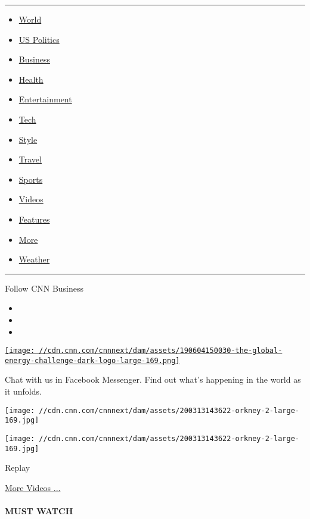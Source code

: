 \begin{center}\rule{0.5\linewidth}{\linethickness}\end{center}

\begin{itemize}
\tightlist
\item
  \href{/world}{World}
\item
  \href{/politics}{US Politics}
\item
  \href{/business}{Business}
\item
  \href{/health}{Health}
\item
  \href{/entertainment}{Entertainment}
\item
  \href{/business/tech}{Tech}
\item
  \href{/style}{Style}
\item
  \href{/travel}{Travel}
\item
  \href{/sport}{Sports}
\item
  \href{/videos}{Videos}
\item
  \href{/specials}{Features}
\item
  \href{/more}{More}
\item
  \href{/weather}{Weather}
\end{itemize}

\begin{center}\rule{0.5\linewidth}{\linethickness}\end{center}

Follow CNN Business

\begin{itemize}
\item
\item
\item
\end{itemize}

\href{/specials/business/global-energy-challenge}{\texttt{[image: //cdn.cnn.com/cnnnext/dam/assets/190604150030-the-global-energy-challenge-dark-logo-large-169.png]}}

Chat with us in Facebook Messenger. Find out what's happening in the
world as it unfolds.

\texttt{[image: //cdn.cnn.com/cnnnext/dam/assets/200313143622-orkney-2-large-169.jpg]}

\texttt{[image: //cdn.cnn.com/cnnnext/dam/assets/200313143622-orkney-2-large-169.jpg]}\href{javascript:void(0);}{}

Replay

\href{/videos}{More Videos ...}

\hypertarget{must-watch}{%
\paragraph{MUST WATCH}\label{must-watch}}

